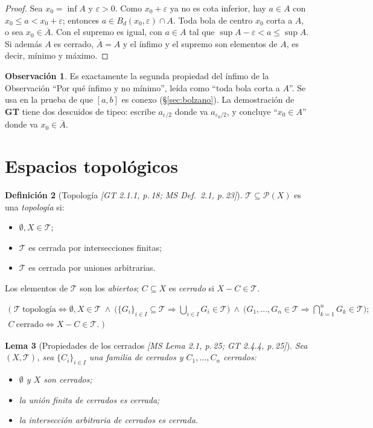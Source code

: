 \documentclass[11pt,a4paper]{article}
\newenvironment{lista}{\leavevmode\begin{itemize}[leftmargin=1.5em,itemsep=1pt,topsep=2pt,parsep=0pt]}{\end{itemize}}
\newcommand{\lgc}[1]{\par\vspace{-3pt}\begin{gather*}\big(\;#1\;\big)\end{gather*}\vspace{-6pt}}
\theoremstyle{definition}
\newtheorem{definicion}{Definición}[section]
\newtheorem{observacion}[definicion]{Observación}
\theoremstyle{plain}
\newtheorem{lema}[definicion]{Lema}
\newcommand{\fnt}[1]{{\normalfont\small\itshape\color{gray!150!black}[#1]}}
\newcommand{\cl}[1]{\overline{#1}}
\newcommand{\Bola}[2]{B_d(#1,#2)}
\newcommand{\tp}{\mathcal{T}}
\begin{document}
\begin{proof}
Sea $x_0=\inf A$ y $\varepsilon>0$. Como $x_0+\varepsilon$ ya no es cota inferior, hay $a\in A$ con $x_0\le a<x_0+\varepsilon$; entonces $a\in\Bola{x_0}{\varepsilon}\cap A$. Toda bola de centro $x_0$ corta a $A$, o sea $x_0\in\cl A$. Con el supremo es igual, con $a\in A$ tal que $\sup A-\varepsilon<a\le\sup A$. Si además $A$ es cerrado, $\cl A=A$ y el ínfimo y el supremo son elementos de $A$, es decir, mínimo y máximo.
\end{proof}

\begin{observacion}
Es exactamente la segunda propiedad del ínfimo de la Observación ``Por qué ínfimo y no mínimo'', leída como ``toda bola corta a $A$''. Se usa en la prueba de que $[a,b]$ es conexo (\S\ref{sec:bolzano}). La demostración de \textbf{GT} tiene dos descuidos de tipeo: escribe $a_{\varepsilon/2}$ donde va $a_{\varepsilon_0/2}$, y concluye ``$x_0\in A$'' donde va $x_0\in\cl A$.
\end{observacion}

\section{Espacios topológicos}\label{sec:top}

\begin{definicion}[Topología \fnt{GT 2.1.1, p.\,18; MS Def.\ 2.1, p.\,23}]
$\tp\subseteq\mathcal{P}(X)$ es una \emph{topología} si:
\begin{lista}
\item $\emptyset,X\in\tp$;
\item $\tp$ es cerrada por intersecciones finitas;
\item $\tp$ es cerrada por uniones arbitrarias.
\end{lista}
Los elementos de $\tp$ son los \emph{abiertos}; $C\subseteq X$ es \emph{cerrado} si $X-C\in\tp$.
\lgc{\tp\ \text{topología}\iff \emptyset,X\in\tp\ \wedge\ \Big(\{G_i\}_{i\in I}\subseteq\tp\Rightarrow\bigcup_{i\in I}G_i\in\tp\Big)
\ \wedge\ \Big(G_1,\dots,G_n\in\tp\Rightarrow\bigcap_{k=1}^{n}G_k\in\tp\Big);\\
C\ \text{cerrado}\iff X-C\in\tp.}
\end{definicion}

\begin{lema}[Propiedades de los cerrados \fnt{MS Lema 2.1, p.\,25; GT 2.4.4, p.\,25}]
Sea $(X,\tp)$, sea $\{C_i\}_{i\in I}$ una familia de cerrados y $C_1,\dots,C_n$ cerrados:
\begin{lista}
\item $\emptyset$ y $X$ son cerrados;
\item la unión finita de cerrados es cerrada;
\item la intersección arbitraria de cerrados es cerrada.
\end{lista}
\end{lema}
\end{document}
